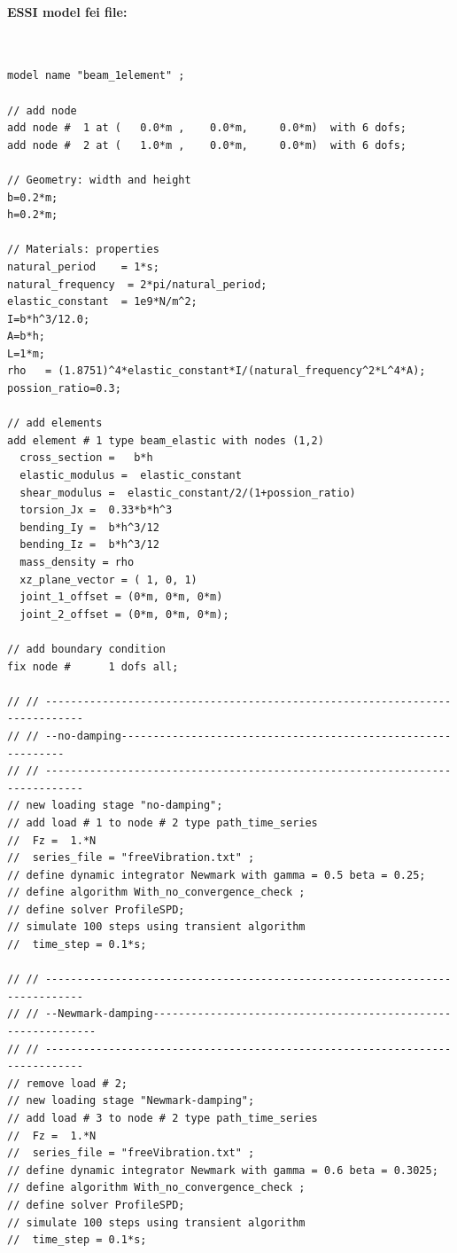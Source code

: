 \paragraph{ESSI model fei file: } ~

\begin{lstlisting}
model name "beam_1element" ;

// add node
add node #  1 at (   0.0*m ,    0.0*m,     0.0*m)  with 6 dofs;
add node #  2 at (   1.0*m ,    0.0*m,     0.0*m)  with 6 dofs;
  
// Geometry: width and height
b=0.2*m;
h=0.2*m;

// Materials: properties
natural_period    = 1*s;        
natural_frequency  = 2*pi/natural_period;
elastic_constant  = 1e9*N/m^2; 
I=b*h^3/12.0;
A=b*h;
L=1*m;
rho   = (1.8751)^4*elastic_constant*I/(natural_frequency^2*L^4*A);
possion_ratio=0.3;

// add elements
add element # 1 type beam_elastic with nodes (1,2) 
  cross_section =   b*h 
  elastic_modulus =  elastic_constant
  shear_modulus =  elastic_constant/2/(1+possion_ratio)
  torsion_Jx =  0.33*b*h^3
  bending_Iy =  b*h^3/12
  bending_Iz =  b*h^3/12
  mass_density = rho
  xz_plane_vector = ( 1, 0, 1) 
  joint_1_offset = (0*m, 0*m, 0*m) 
  joint_2_offset = (0*m, 0*m, 0*m);

// add boundary condition
fix node #      1 dofs all;

// // ----------------------------------------------------------------------------
// // --no-damping-------------------------------------------------------------
// // ----------------------------------------------------------------------------
// new loading stage "no-damping";
// add load # 1 to node # 2 type path_time_series 
//  Fz =  1.*N
//  series_file = "freeVibration.txt" ;
// define dynamic integrator Newmark with gamma = 0.5 beta = 0.25;
// define algorithm With_no_convergence_check ;
// define solver ProfileSPD;
// simulate 100 steps using transient algorithm 
//  time_step = 0.1*s;

// // ----------------------------------------------------------------------------
// // --Newmark-damping-------------------------------------------------------------
// // ----------------------------------------------------------------------------
// remove load # 2;
// new loading stage "Newmark-damping";
// add load # 3 to node # 2 type path_time_series 
//  Fz =  1.*N
//  series_file = "freeVibration.txt" ;
// define dynamic integrator Newmark with gamma = 0.6 beta = 0.3025;
// define algorithm With_no_convergence_check ;
// define solver ProfileSPD;
// simulate 100 steps using transient algorithm 
//  time_step = 0.1*s;


\end{lstlisting}
